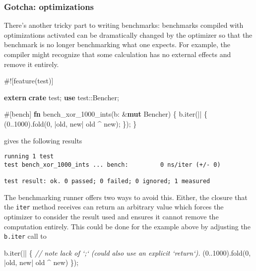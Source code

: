 \documentclass[a4paper,]{book}
\newenvironment{Shaded}{\begin{snugshade}}{\end{snugshade}}
\newcommand{\KeywordTok}[1]{\textcolor[rgb]{0.13,0.29,0.53}{\textbf{{#1}}}}
\newcommand{\DecValTok}[1]{\textcolor[rgb]{0.00,0.00,0.81}{{#1}}}
\newcommand{\CommentTok}[1]{\textcolor[rgb]{0.56,0.35,0.01}{\textit{{#1}}}}
\newcommand{\AttributeTok}[1]{\textcolor[rgb]{0.77,0.63,0.00}{{#1}}}
\newcommand{\NormalTok}[1]{{#1}}
\begin{document}
\subsubsection{Gotcha: optimizations}\label{gotcha-optimizations}

There's another tricky part to writing benchmarks: benchmarks compiled
with optimizations activated can be dramatically changed by the
optimizer so that the benchmark is no longer benchmarking what one
expects. For example, the compiler might recognize that some calculation
has no external effects and remove it entirely.

\begin{Shaded}
\begin{Highlighting}[]
\AttributeTok{#![}\NormalTok{feature}\AttributeTok{(}\NormalTok{test}\AttributeTok{)]}

\KeywordTok{extern} \KeywordTok{crate} \NormalTok{test;}
\KeywordTok{use} \NormalTok{test::Bencher;}

\AttributeTok{#[}\NormalTok{bench}\AttributeTok{]}
\KeywordTok{fn} \NormalTok{bench_xor_1000_ints(b: &}\KeywordTok{mut} \NormalTok{Bencher) \{}
    \NormalTok{b.iter(|| \{}
        \NormalTok{(}\DecValTok{0.}\NormalTok{.}\DecValTok{1000}\NormalTok{).fold(}\DecValTok{0}\NormalTok{, |old, new| old ^ new);}
    \NormalTok{\});}
\NormalTok{\}}
\end{Highlighting}
\end{Shaded}

gives the following results

\begin{verbatim}
running 1 test
test bench_xor_1000_ints ... bench:         0 ns/iter (+/- 0)

test result: ok. 0 passed; 0 failed; 0 ignored; 1 measured
\end{verbatim}

The benchmarking runner offers two ways to avoid this. Either, the
closure that the \texttt{iter} method receives can return an arbitrary
value which forces the optimizer to consider the result used and ensures
it cannot remove the computation entirely. This could be done for the
example above by adjusting the \texttt{b.iter} call to

\begin{Shaded}
\begin{Highlighting}[]
\NormalTok{b.iter(|| \{}
    \CommentTok{// note lack of `;` (could also use an explicit `return`).}
    \NormalTok{(}\DecValTok{0.}\NormalTok{.}\DecValTok{1000}\NormalTok{).fold(}\DecValTok{0}\NormalTok{, |old, new| old ^ new)}
\NormalTok{\});}
\end{Highlighting}
\end{Shaded}
\end{document}

